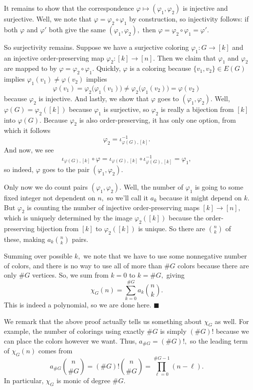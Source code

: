 It remains to show that the correspondence $\varphi\mapsto(\varphi_1,\varphi_2)$ is injective and surjective. Well, we note that $\varphi=\varphi_2\circ\varphi_1$ by construction, so injectivity follows: if both $\varphi$ and $\varphi'$ both give the same $(\varphi_1,\varphi_2),$ then $\varphi=\varphi_2\circ\varphi_1=\varphi'.$

So surjectivity remains. Suppose we have a surjective coloring $\varphi_1:G\to[k]$ and an injective order-preserving map $\varphi_2:[k]\to[n].$ Then we claim that $\varphi_1$ and $\varphi_2$ are mapped to by $\varphi=\varphi_2\circ\varphi_1.$ Quickly, $\varphi$ is a coloring because $\{v_1,v_2\}\in E(G)$ implies $\varphi_1(v_1)\ne\varphi(v_2)$ implies
\[\varphi(v_1)=\varphi_2\big(\varphi_1(v_1)\big)\ne\varphi_2\big(\varphi_1(v_2)\big)=\varphi(v_2)\]
because $\varphi_2$ is injective. And lastly, we show that $\varphi$ goes to $(\varphi_1,\varphi_2).$ Well, $\varphi(G)=\varphi_2([k])$ because $\varphi_1$ is surjective, so $\varphi_2$ is really a bijection from $[k]$ into $\varphi(G).$ Because $\varphi_2$ is also order-preserving, it has only one option, from which it follows
\[\varphi_2=\iota^{-1}_{\varphi(G),[k]}.\]
And now, we see
\[\iota_{\varphi(G),[k]}\circ\varphi=\iota_{\varphi(G),[k]}\circ\iota^{-1}_{\varphi(G),[k]}=\varphi_1,\]
so indeed, $\varphi$ goes to the pair $(\varphi_1,\varphi_2).$

Only now we do count pairs $(\varphi_1,\varphi_2).$ Well, the number of $\varphi_1$ is going to some fixed integer not dependent on $n,$ so we'll call it $a_k$ because it might depend on $k.$ But $\varphi_2$ is counting the number of injective order-preserving maps $[k]\to[n],$ which is uniquely determined by the image $\varphi_2([k])$ because the order-preserving bijection from $[k]$ to $\varphi_2([k])$ is unique. So there are $\binom nk$ of these, making $a_k\binom nk$ pairs.

Summing over possible $k,$ we note that we have to use some nonnegative number of colors, and there is no way to use all of more than $\#G$ colors because there are only $\#G$ vertices. So, we sum from $k=0$ to $k=\#G,$ giving
\[\chi_G(n)=\sum_{k=0}^{\#G}a_k\binom nk.\]
This is indeed a polynomial, so we are done here. $\blacksquare$

We remark that the above proof actually tells us something about $\chi_G$ as well. For example, the number of colorings using exactly $\#G$ is simply $(\#G)!$ because we can place the colors however we want. Thus, $a_{\#G}=(\#G)!,$ so the leading term of $\chi_G(n)$ comes from
\[a_{\#G}\binom n{\#G}=(\#G)!\binom n{\#G}=\prod_{\ell=0}^{\#G-1}(n-\ell).\]
In particular, $\chi_G$ is monic of degree $\#G.$


